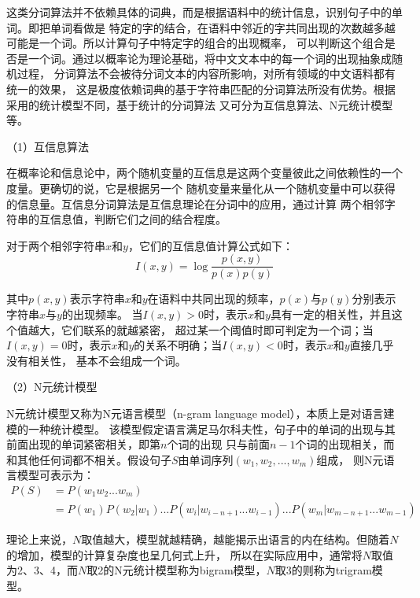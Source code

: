 这类分词算法并不依赖具体的词典，而是根据语料中的统计信息，识别句子中的单词。即把单词看做是
特定的字的结合，在语料中邻近的字共同出现的次数越多越可能是一个词。所以计算句子中特定字的组合的出现概率，
可以判断这个组合是否是一个词。通过以概率论为理论基础，将中文文本中的每一个词的出现抽象成随机过程，
分词算法不会被待分词文本的内容所影响，对所有领域的中文语料都有统一的效果，
这是极度依赖词典的基于字符串匹配的分词算法所没有优势。根据采用的统计模型不同，基于统计的分词算法
又可分为互信息算法、N元统计模型等。

（1）互信息算法

在概率论和信息论中，两个随机变量的互信息是这两个变量彼此之间依赖性的一个度量。更确切的说，它是根据另一个
随机变量来量化从一个随机变量中可以获得的信息量。互信息分词算法是互信息理论在分词中的应用，通过计算
两个相邻字符串的互信息值，判断它们之间的结合程度。

对于两个相邻字符串$x$和$y$，它们的互信息值计算公式如下：
\begin{equation}
    I\left ( x,y \right )=\log \frac{p\left ( x,y \right )}{p\left ( x \right )p\left ( y \right )}
\end{equation}

其中$p\left ( x,y \right )$表示字符串$x$和$y$在语料中共同出现的频率，$p\left ( x \right )$与$p\left ( y \right )$分别表示字符串$x$与$y$的出现频率。
当$I\left ( x,y \right )>0$时，表示$x$和$y$具有一定的相关性，并且这个值越大，它们联系的就越紧密，
超过某一个阈值时即可判定为一个词；当$I\left ( x,y \right )=0$时，表示$x$和$y$的关系不明确；当$I\left ( x,y \right )<0$时，表示$x$和$y$直接几乎没有相关性，
基本不会组成一个词。

（2）N元统计模型

N元统计模型又称为N元语言模型（n-gram language model），本质上是对语言建模的一种统计模型。
该模型假定语言满足马尔科夫性，句子中的单词的出现与其前面出现的单词紧密相关，即第$n$个词的出现
只与前面$n-1$个词的出现相关，而和其他任何词都不相关。假设句子$S$由单词序列$\left (w_1,w_2,...,w_m  \right )$组成，
则N元语言模型可表示为：
\begin{equation}
    \begin{aligned}
        P\left ( S \right )&=P\left ( w_1w_2...w_m \right )\\
        &=P\left ( w_1 \right )P\left ( w_2|w_1 \right )...
P\left ( w_i|w_{i-n+1}...w_{i-1} \right )...P\left ( w_m|w_{m-n+1}...w_{m-1} \right )
    \end{aligned}
    \label{n-gram}
\end{equation}

理论上来说，$N$取值越大，模型就越精确，越能揭示出语言的内在结构。但随着$N$的增加，模型的计算复杂度也呈几何式上升，
所以在实际应用中，通常将$N$取值为2、3、4，而$N$取2的N元统计模型称为bigram模型，$N$取3的则称为trigram模型。

